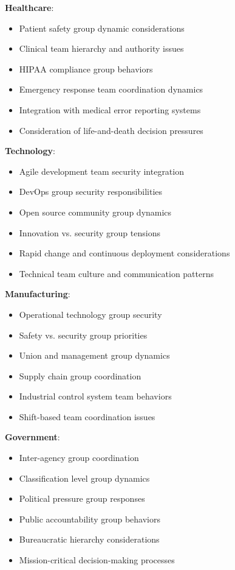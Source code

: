 \documentclass[11pt,a4paper]{article}
\begin{document}
\textbf{Healthcare}:
\begin{itemize}
\item Patient safety group dynamic considerations
\item Clinical team hierarchy and authority issues
\item HIPAA compliance group behaviors
\item Emergency response team coordination dynamics
\item Integration with medical error reporting systems
\item Consideration of life-and-death decision pressures
\end{itemize}

\textbf{Technology}:
\begin{itemize}
\item Agile development team security integration
\item DevOps group security responsibilities
\item Open source community group dynamics
\item Innovation vs. security group tensions
\item Rapid change and continuous deployment considerations
\item Technical team culture and communication patterns
\end{itemize}

\textbf{Manufacturing}:
\begin{itemize}
\item Operational technology group security
\item Safety vs. security group priorities
\item Union and management group dynamics
\item Supply chain group coordination
\item Industrial control system team behaviors
\item Shift-based team coordination issues
\end{itemize}

\textbf{Government}:
\begin{itemize}
\item Inter-agency group coordination
\item Classification level group dynamics
\item Political pressure group responses
\item Public accountability group behaviors
\item Bureaucratic hierarchy considerations
\item Mission-critical decision-making processes
\end{itemize}
\end{document}
